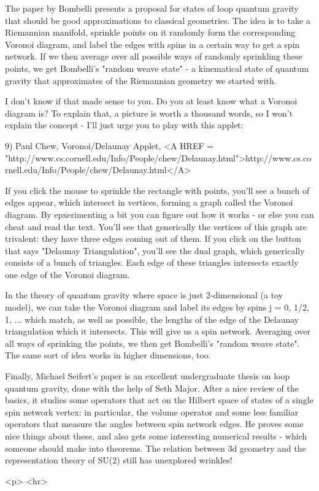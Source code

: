The paper by Bombelli presents a proposal for states of loop quantum
gravity that should be good approximations to classical geometries.  The
idea is to take a Riemannian manifold, sprinkle points on it randomly
form the corresponding Voronoi diagram, and label the edges with spins
in a certain way to get a spin network.  If we then average over all
possible ways of randomly sprinkling these points, we get Bombelli's
"random weave state" - a kinematical state of quantum gravity that
approximates of the Riemannian geometry we started with.

I don't know if that made sense to you.  Do you at least know what a
Voronoi diagram is?  To explain that, a picture is worth a thousand
words, so I won't explain the concept - I'll just urge you to play 
with this applet:

9) Paul Chew, Voronoi/Delaunay Applet, 
<A HREF = "http://www.cs.cornell.edu/Info/People/chew/Delaunay.html">http://www.cs.cornell.edu/Info/People/chew/Delaunay.html</A>

If you click the mouse to sprinkle the rectangle with points, you'll see
a bunch of edges appear, which intersect in vertices, forming a graph
called the Voronoi diagram.  By epxerimenting a bit you can figure out
how it works - or else you can cheat and read the text.  You'll see that
generically the vertices of this graph are trivalent: they have three
edges coming out of them.  If you click on the button that says
"Delaunay Triangulation", you'll see the dual graph, which
generically consists of a bunch of triangles.  Each edge of these
triangles intersects exactly one edge of the Voronoi diagram.

In the theory of quantum gravity where space is just 2-dimensional (a
toy model), we can take the Voronoi diagram and label its edges by spins
j = 0, 1/2, 1, ... which match, as well as possible, the lengths of the
edge of the Delaunay triangulation which it intersects.  This will give
us a spin network.  Averaging over all ways of sprinking the points, we
then get Bombelli's "random weave state".  The same sort of idea works
in higher dimensions, too.

Finally, Michael Seifert's paper is an excellent undergraduate thesis on
loop quantum gravity, done with the help of Seth Major.  After a nice
review of the basics, it studies some operators that act on the Hilbert
space of states of a single spin network vertex: in particular, the
volume operator and some less familiar operators that measure the angles
between spin network edges.  He proves some nice things about these, and
also gets some interesting numerical results - which someone should make
into theorems.  The relation between 3d geometry and the representation
theory of SU(2) still has unexplored wrinkles!






<p> <hr>




